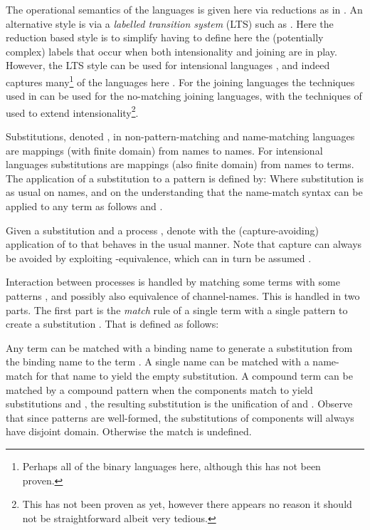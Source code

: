 \documentclass[submission,copyright,creativecommons]{eptcs}
\begin{document}
The operational semantics of the languages is given here via reductions as in
\cite{milner:polyadic-tutorial,Honda95onreduction-based,givenwilson:hal-01026301}.
An alternative style is via a {\em labelled transition system} (LTS) such as \cite{G:IC08}.
Here the reduction based style is to simplify having to define here the (potentially complex)
labels that occur when both intensionality and joining are in play. However, the LTS style can be
used for intensional languages \cite{BJPV11,GivenWilsonPHD,GivenWilsonGorla13}, and indeed
captures many\footnote
{Perhaps all of the binary languages here, although this has not been proven.}
of the languages here \cite{GivenWilsonGorla13}.
For the joining languages the techniques used in \cite{Fournet99bisimulationsin} can be used for
the no-matching joining languages, with the techniques of \cite{GivenWilsonGorla13} used to extend
intensionality\footnote{This has not been proven as yet, however there appears no reason it should not be
straightforward albeit very tedious.}.

Substitutions, denoted , in non-pattern-matching and name-matching
languages are mappings (with finite domain) from names to names. For intensional languages
substitutions are mappings (also finite domain) from names to terms.
The application of a substitution  to a pattern  is defined by: 
Where substitution is as usual on names, and on the understanding that the name-match
syntax can be applied to any term as follows
 and .


Given a substitution  and a process , denote with  the
(capture-avoiding) application of  to  that behaves in the usual manner.
Note that capture can always be avoided by exploiting -equivalence, which can
in turn be assumed \cite{UBN07}. 

\renewcommand{\match}[2]{\{#1/\!\!/#2\}}

Interaction between processes is handled by matching some terms  with
some patterns , and possibly also equivalence of channel-names.
This is handled in two parts. The first part is the {\em match} rule  of a single term 
with a single pattern  to create a substitution .
That is defined as follows:

Any term  can be matched with a binding name  to generate a substitution from the
binding name to the term .
A single name  can be matched with a name-match for that name  to yield the
empty substitution.
A compound term  can be matched by a compound pattern  when
the components match to yield substitutions  and ,
the resulting substitution is the unification of  and .
Observe that since patterns are well-formed, the substitutions of components will always have
disjoint domain.
Otherwise the match is undefined.
\end{document}

